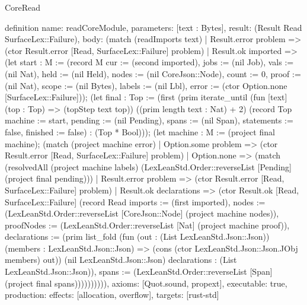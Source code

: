 \begin{lexlean}{CoreRead}
\begin{semanticmodule}
definition{
  name: readCoreModule,
  parameters: [text : Bytes],
  result: (Result Read SurfaceLex::Failure),
  body: (match (readImports text)
    | Result.error problem => (ctor Result.error [Read, SurfaceLex::Failure] problem)
    | Result.ok imported => (let start : M := (record M {cur := (second imported), jobs := (nil Job), vals := (nil Nat), held := (nil Held), nodes := (nil CoreJson::Node), count := 0, proof := (nil Nat), scope := (nil Bytes), labels := (nil Lbl), error := (ctor Option.none [SurfaceLex::Failure])}); (let final : Top := (first (prim iterate_until (fun [text] (top : Top) => (topStep text top)) ((prim length text : Nat) + 2) (record Top {machine := start, pending := (nil Pending), spans := (nil Span), statements := false, finished := false}) : (Top * Bool))); (let machine : M := (project final machine); (match (project machine error)
      | Option.some problem => (ctor Result.error [Read, SurfaceLex::Failure] problem)
      | Option.none => (match (resolvedAll (project machine labels) (LexLeanStd.Order::reverseList [Pending] (project final pending)))
        | Result.error problem => (ctor Result.error [Read, SurfaceLex::Failure] problem)
        | Result.ok declarations => (ctor Result.ok [Read, SurfaceLex::Failure] (record Read {imports := (first imported), nodes := (LexLeanStd.Order::reverseList [CoreJson::Node] (project machine nodes)), proofNodes := (LexLeanStd.Order::reverseList [Nat] (project machine proof)), declarations := (prim list_fold (fun (out : (List LexLeanStd.Json::Json)) (members : LexLeanStd.Json::Json) => (cons (ctor LexLeanStd.Json::Json.JObj members) out)) (nil LexLeanStd.Json::Json) declarations : (List LexLeanStd.Json::Json)), spans := (LexLeanStd.Order::reverseList [Span] (project final spans))})))))))),
  axioms: [Quot.sound, propext],
  executable: true,
  production: {effects: [allocation, overflow], targets: [rust-std]}
}
\end{semanticmodule}
\end{lexlean}
